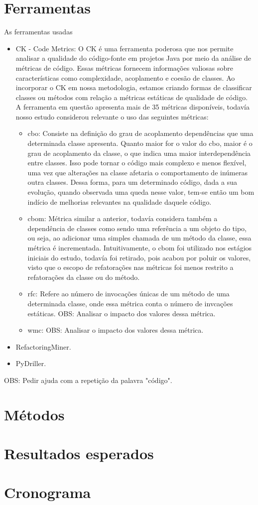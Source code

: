 \section{Ferramentas}\label{sec:ferramentas}
As ferramentas usadas 
\begin{itemize}
    \item CK - Code Metrics: O CK é uma ferramenta poderosa que nos permite analisar a qualidade do código-fonte em projetos Java por meio da análise de métricas de código. Essas métricas fornecem informações valiosas sobre características como complexidade, acoplamento e coesão de classes. Ao incorporar o CK em nossa metodologia, estamos criando formas de classificar classes ou métodos com relação a métricas estáticas de qualidade de código. A ferramenta em questão apresenta mais de 35 métricas disponíveis, todavía nosso estudo considerou relevante o uso das seguintes métricas:
    \begin{itemize}
        \item \gls{cbo}: Consiste na definição do grau de acoplamento dependências que uma determinada classe apresenta. Quanto maior for o valor do \gls{cbo}, maior é o grau de acoplamento da classe, o que indica uma maior interdependência entre classes. Isso pode tornar o código mais complexo e menos flexível, uma vez que alterações na classe afetaria o comportamento de inúmeras outra classes. Dessa forma, para um determinado código, dada a sua evolução, quando observada uma queda nesse valor, tem-se então um bom indício de melhorias relevantes na qualidade daquele código.
        \item \gls{cbom}: Métrica similar a anterior, todavía considera também a dependência de classes como sendo uma referência a um objeto do tipo, ou seja, ao adicionar uma simples chamada de um método da classe, essa métrica é incrementada. Intuitivamente, o \gls{cbom} foi utilizado nos estágios iniciais do estudo, todavía foi retirado, pois acabou por poluir os valores, visto que o escopo de refatorações nas métricas foi menos restrito a refatorações da classe ou do método.
        \item \gls{rfc}: Refere ao número de invocações únicas de um método de uma determinada classe, onde essa métrica conta o número de invcações estáticas. OBS: Analisar o impacto dos valores dessa métrica.
        \item \gls{wmc}: OBS: Analisar o impacto dos valores dessa métrica.
    \end{itemize}
    \item RefactoringMiner.
    \item PyDriller.
\end{itemize}

OBS: Pedir ajuda com a repetição da palavra "código".

\section{Métodos}\label{sec:metodo}



\section{Resultados esperados}



\section{Cronograma}